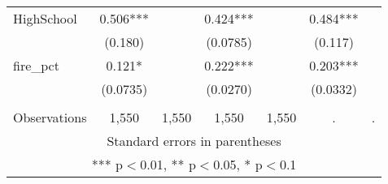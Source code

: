 \begin{tabular}{lcccccc}
HighSchool & 0.506*** &  & 0.424*** &  & 0.484*** &  \\
 & (0.180) &  & (0.0785) &  & (0.117) &  \\
fire\_pct & 0.121* &  & 0.222*** &  & 0.203*** &  \\
 & (0.0735) &  & (0.0270) &  & (0.0332) &  \\
 &  &  &  &  &  &  \\
 Observations & 1,550 & 1,550 & 1,550 & 1,550 & . & . \\ \hline
\multicolumn{7}{c}{ Standard errors in parentheses} \\
\multicolumn{7}{c}{ *** p$<$0.01, ** p$<$0.05, * p$<$0.1} \\
\end{tabular}
